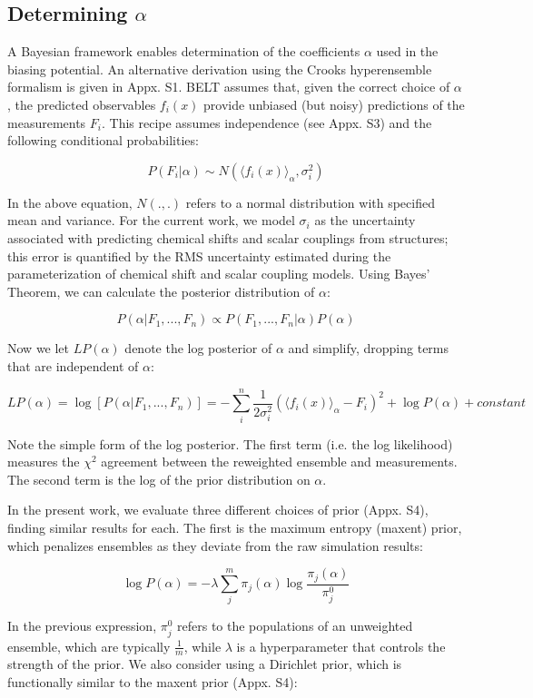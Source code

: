 \documentclass[12pt]{article}
\begin{document}
\subsection*{Determining $\alpha$}

A Bayesian framework enables determination of the coefficients $\alpha$ used in the biasing potential.  An alternative derivation using the Crooks hyperensemble formalism \cite{crooks2007beyond} is given in Appx. S1.  BELT assumes that, given the correct choice of $\alpha$, the predicted observables $f_i(x)$ provide unbiased (but noisy) predictions of the measurements $F_i$.  This recipe assumes independence (see Appx. S3) and the following conditional probabilities:

$$P(F_i | \alpha) \sim N(\langle f_i(x)\rangle _\alpha, \sigma_i^2)$$

In the above equation, $N(., .)$ refers to a normal distribution with specified mean and variance.  For the current work, we model $\sigma_i$ as the uncertainty associated with predicting chemical shifts and scalar couplings from structures; this error is quantified by the RMS uncertainty estimated during the parameterization of chemical shift and scalar coupling models.  Using Bayes' Theorem, we can calculate the posterior distribution of $\alpha$:

$$P(\alpha | F_1, ..., F_n) \propto P(F_1, ..., F_n | \alpha) P(\alpha)$$

Now we let $LP(\alpha)$ denote the log posterior of $\alpha$ and simplify, dropping terms that are independent of $\alpha$:

$$LP(\alpha) = \log[ P(\alpha|F_1, ..., F_n)] = -\sum_i^n \frac{1}{2\sigma_i^2}(\langle f_i(x)\rangle _\alpha - F_i)^2 + \log P(\alpha) + constant$$

Note the simple form of the log posterior.  The first term (i.e. the log likelihood) measures the $\chi^2$ agreement between the reweighted ensemble and measurements.  The second term is the log of the prior distribution on $\alpha$.  

In the present work, we evaluate three different choices of prior (Appx. S4), finding similar results for each.  The first is the maximum entropy (maxent) prior, which penalizes ensembles as they deviate from the raw simulation results:

$$\log P(\alpha) = -\lambda \sum_j^m \pi_j(\alpha) \log \frac{\pi_j(\alpha)}{\pi_j^0}$$

In the previous expression, $\pi_j^0$ refers to the populations of an unweighted ensemble, which are typically $\frac{1}{m}$, while $\lambda$ is a hyperparameter that controls the strength of the prior.  We also consider using a Dirichlet prior, which is functionally similar to the maxent prior (Appx. S4):
\end{document}
